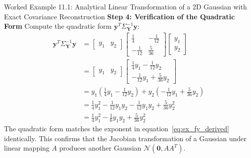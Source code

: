 \begin{examplebox}[breakable]{Worked Example 11.1: Analytical Linear Transformation of a 2D Gaussian with Exact Covariance Reconstruction}
\textbf{Step 4: Verification of the Quadratic Form}
Compute the quadratic form $\mathbf{y}^T \Sigma_{\mathbf{Y}}^{-1} \mathbf{y}$:
\begin{align}
\mathbf{y}^T \Sigma_{\mathbf{Y}}^{-1} \mathbf{y} &= \begin{bmatrix} y_1 & y_2 \end{bmatrix} \begin{bmatrix} \frac{1}{4} & -\frac{1}{12} \\ -\frac{1}{12} & \frac{5}{36} \end{bmatrix} \begin{bmatrix} y_1 \\ y_2 \end{bmatrix} \nonumber \\
&= \begin{bmatrix} y_1 & y_2 \end{bmatrix} \begin{bmatrix} \frac{1}{4}y_1 - \frac{1}{12}y_2 \\ -\frac{1}{12}y_1 + \frac{5}{36}y_2 \end{bmatrix} \nonumber \\
&= y_1\left( \frac{1}{4}y_1 - \frac{1}{12}y_2 \right) + y_2\left( -\frac{1}{12}y_1 + \frac{5}{36}y_2 \right) \nonumber \\
&= \frac{1}{4}y_1^2 - \frac{1}{12}y_1 y_2 - \frac{1}{12}y_1 y_2 + \frac{5}{36}y_2^2 \nonumber \\
&= \frac{1}{4}y_1^2 - \frac{1}{6}y_1 y_2 + \frac{5}{36}y_2^2
\end{align}
The quadratic form matches the exponent in equation~\eqref{eq:ex_fy_derived} identically. This confirms that the Jacobian transformation of a Gaussian under linear mapping $A$ produces another Gaussian $\mathcal{N}(\mathbf{0}, A A^T)$.
\end{examplebox}

